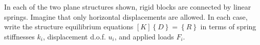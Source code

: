 \documentclass[../main.tex]{subfiles}
\begin{document}

In each of the two plane structures shown, rigid blocks are connected by linear springs.
Imagine that only horizontal displacements are allowed. 
In each case, write the structure equilibrium equations \([K]\left\{D\right\} = \left\{R\right\}\) in terms of spring stiffnesses \(k_i\), displacement d.o.f. \(u_i\), and applied loads \(F_i\).
\end{document}
